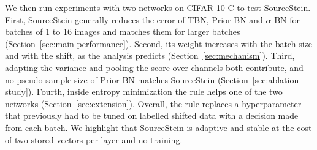 We then run experiments with two networks on CIFAR-10-C \cite{CIFAR10-C} to test SourceStein.
First, SourceStein generally reduces the error of TBN, Prior-BN and $\alpha$-BN for batches of 1 to 16 images and matches them for larger batches (\cf Section~\ref{sec:main-performance}).
Second, its weight increases with the batch size and with the shift, as the analysis predicts (\cf Section~\ref{sec:mechanism}).
Third, adapting the variance and pooling the score over channels both contribute, and no pseudo sample size of Prior-BN matches SourceStein (\cf Section~\ref{sec:ablation-study}).
Fourth, inside entropy minimization the rule helps one of the two networks (\cf Section~\ref{sec:extension}).
Overall, the rule replaces a hyperparameter that previously had to be tuned on labelled shifted data with a decision made from each batch.
We highlight that SourceStein is adaptive and stable at the cost of two stored vectors per layer and no training.
